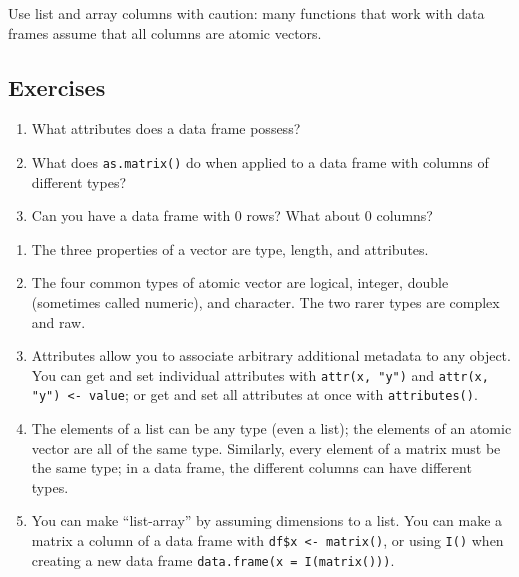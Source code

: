Use list and array columns with caution: many functions that work with
data frames assume that all columns are atomic vectors.

\subsection{Exercises}

\begin{enumerate}
\def\labelenumi{\arabic{enumi}.}
\item
  What attributes does a data frame possess?
\item
  What does \texttt{as.matrix()} do when applied to a data frame with
  columns of different types?
\item
  Can you have a data frame with 0 rows? What about 0 columns?
\end{enumerate}


\begin{enumerate}
\def\labelenumi{\arabic{enumi}.}
\item
  The three properties of a vector are type, length, and attributes.
\item
  The four common types of atomic vector are logical, integer, double
  (sometimes called numeric), and character. The two rarer types are
  complex and raw.
\item
  Attributes allow you to associate arbitrary additional metadata to any
  object. You can get and set individual attributes with
  \texttt{attr(x, "y")} and \texttt{attr(x, "y") \textless{}- value}; or
  get and set all attributes at once with \texttt{attributes()}.
\item
  The elements of a list can be any type (even a list); the elements of
  an atomic vector are all of the same type. Similarly, every element of
  a matrix must be the same type; in a data frame, the different columns
  can have different types.
\item
  You can make ``list-array'' by assuming dimensions to a list. You can
  make a matrix a column of a data frame with
  \texttt{df\$x \textless{}- matrix()}, or using \texttt{I()} when
  creating a new data frame \texttt{data.frame(x = I(matrix()))}.
\end{enumerate}
